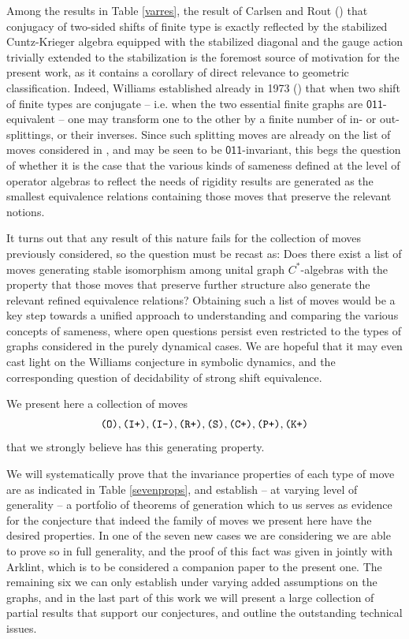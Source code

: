 \documentclass[12pt]{amsbook}%
\theoremstyle{defin}
\theoremstyle{remark}
\numberwithin{equation}{chapter}
\numberwithin{theor}{section}
\newcommand{\xyz}[1]{\mbox{$\mathsf{#1}$}}
\newcommand{\IIIm}{\mbox{\texttt{\textup{(I-)}}}}
\newcommand{\IIIp}{\mbox{\texttt{\textup{(I+)}}}}
\newcommand{\OOO}{\mbox{\texttt{\textup{(O)}}}}
\newcommand{\CCCp}{\mbox{\texttt{\textup{(C+)}}}}
\newcommand{\RRRp}{\mbox{\texttt{\textup{(R+)}}}}
\newcommand{\PPPp}{\mbox{\texttt{\textup{(P+)}}}}
\newcommand{\KKKp}{\mbox{\texttt{\textup{(K+)}}}}
\newcommand{\SSS}{\mbox{\texttt{\textup{(S)}}}}
\begin{document}
Among the results in Table \ref{varres}, the result of Carlsen and Rout (\cite{tmcjr:dgigc}) that conjugacy of two-sided shifts of finite type is exactly reflected by the stabilized Cuntz-Krieger algebra equipped with the stabilized diagonal and the gauge action trivially extended to the stabilization is the foremost source of motivation for the present work, as it
contains a corollary of direct relevance to geometric classification. Indeed, Williams established already in 1973 (\cite{rfw:csft}) that  when two shift of finite types are conjugate -- i.e. when the two essential finite graphs are \xyz{011}-equivalent -- one may transform one to the other by a finite number of in- or out-splittings, or their inverses. Since such splitting moves are already on the list of moves considered in \cite{segrerapws:ccuggs}, and may be seen to be \xyz{011}-invariant, this begs the question of whether it is the case that the various kinds of sameness defined at the level of operator algebras to reflect the needs of rigidity results are generated as the smallest equivalence relations containing those moves that preserve the relevant notions.



It turns out that any result of this nature fails for the collection of moves previously considered, so the question must be recast as: Does there exist a list of moves generating stable isomorphism among unital graph $C^*$-algebras with the property that those moves that preserve further structure also generate the relevant refined equivalence relations? Obtaining such a list of moves would be a key step towards a unified approach to understanding and comparing the various concepts of sameness, where open questions persist even restricted to the types of graphs considered in  the purely dynamical cases. We are hopeful that it may even cast light on the Williams conjecture in symbolic dynamics, and the corresponding question of decidability of strong shift equivalence. 

We present here a  collection of moves
\begin{equation}\label{movelist}
\OOO,\IIIp,\IIIm,\RRRp,\SSS,\CCCp,\PPPp,\KKKp
\end{equation}
 that we strongly believe has this generating property.



We will systematically prove that the invariance properties of each type of move are as indicated in Table \ref{sevenprops}, and establish -- at varying level of  generality -- a portfolio of theorems of generation which to us serves as evidence for the conjecture that indeed the family of moves we present here have the desired properties. In one of the seven new cases we are considering  we are able to prove so in full generality, and the proof of this fact was given in \cite{seaseer:gciugc} jointly with Arklint, which is to be considered a companion paper to the present one. The remaining six we can only establish under varying added assumptions on the graphs, and in the last part of this work we will present a large collection of partial results that support our conjectures, and outline the outstanding technical issues.
\end{document}
